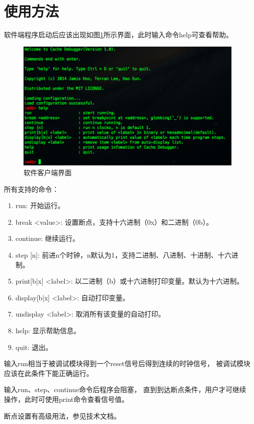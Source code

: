 \section{使用方法}
    软件端程序启动后应该出现如图\ref{client}所示界面，此时输入命令help可查看帮助。

    \begin{figure}[!hbp]
            \caption{软件客户端界面}\label{client}
            \centering
            \includegraphics[width=\textwidth]{chart/cadb_client}
    \end{figure}

    所有支持的命令：
    \begin{enumerate}
    \item
    run: 开始运行。
    \item
    break <value>: 设置断点，支持十六进制（0x）和二进制（0b）。
    \item
    continue: 继续运行。
    \item
    step [n]: 前进n个时钟，n默认为1，支持二进制、八进制、十进制、十六进制。
    \item
    print[b|x] <label>: 以二进制（b）或十六进制打印变量。默认为十六进制。
    \item
    display[b|x] <label>: 自动打印变量。
    \item
    undisplay <label>: 取消所有该变量的自动打印。
    \item
    help: 显示帮助信息。
    \item
    quit: 退出。
    \end{enumerate}

    输入run相当于被调试模块得到一个reset信号后得到连续的时钟信号，%
    被调试模块应该在此条件下能正确运行。

    输入run、step、continue命令后程序会阻塞，%
    直到到达断点条件，用户才可继续操作，此时可使用print命令查看信号值。

    断点设置有高级用法，参见技术文档。

